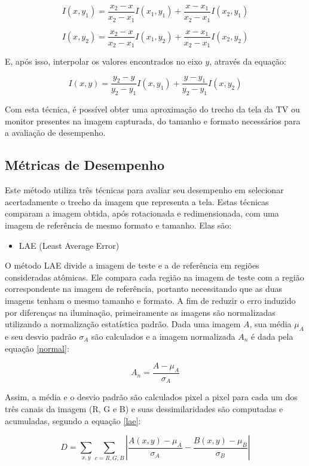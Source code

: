 $$ I(x,y_1) = \frac{x_2-x}{x_2-x_1}I(x_1,y_1) + \frac{x-x_1}{x_2-x_1}I(x_2,y_1) $$

$$ I(x,y_2) = \frac{x_2-x}{x_2-x_1}I(x_1,y_2) + \frac{x-x_1}{x_2-x_1}I(x_2,y_2) $$


E, após isso, interpolar os valores encontrados no eixo $y$, através da equação:

$$ I(x,y) = \frac{y_2-y}{y_2-y_1}I(x,y_1) + \frac{y-y_1}{y_2-y_1}I(x,y_2)$$

Com esta técnica, é possível obter uma aproximação do trecho da tela da TV ou monitor presentes na imagem capturada, do tamanho e formato necessários para a avaliação de desempenho.

\subsection{Métricas de Desempenho}

Este método utiliza três técnicas para avaliar seu desempenho em selecionar acertadamente o trecho da imagem que representa a tela. Estas técnicas comparam a imagem obtida, após rotacionada e redimensionada, com uma imagem de referência de mesmo formato e tamanho. Elas são:
\begin{itemize}
\item LAE (Least Average Error)
\end{itemize}




O método LAE divide a imagem de teste e a de referência em regiões consideradas atômicas. Ele compara cada região na imagem de teste com a região correspondente na imagem de referência, portanto necessitando que as duas imagens tenham o mesmo tamanho e formato. A fim de reduzir o erro induzido por diferenças na iluminação, primeiramente as imagens são normalizadas utilizando a normalização estatística padrão. Dada uma imagem $A$, sua média $\mu_A$ e seu desvio padrão $\sigma_A$ são calculados e a imagem normalizada $A_n$ é dada pela equação \ref{normal}:

\begin{equation}
A_n = \frac{A-\mu_A}{\sigma_A} \label{normal}
\end{equation}

Assim, a média e o desvio padrão são calculados pixel a pixel para cada um dos três canais da imagem (R, G e B) e suas dessimilaridades são computadas e acumuladas, segundo a equação \ref{lae}:

\begin{equation}
D = \sum_ {x,y}^{} \sum_{c=R,G,B}^{} \left | \frac{A(x,y)-\mu _A}{\sigma _A} - \frac{B(x,y)-\mu _B}{\sigma _B} \right |
\label{lae}
\end{equation}


